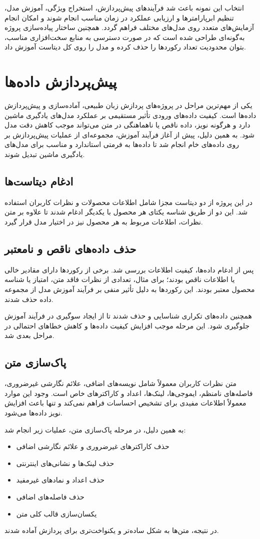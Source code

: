 انتخاب این نمونه باعث شد فرآیندهای پیش‌پردازش، استخراج ویژگی، آموزش مدل، تنظیم ابرپارامترها و ارزیابی عملکرد در زمان مناسب انجام شوند و امکان انجام آزمایش‌های متعدد روی مدل‌های مختلف فراهم گردد. همچنین ساختار پیاده‌سازی پروژه به‌گونه‌ای طراحی شده است که در صورت دسترسی به منابع سخت‌افزاری مناسب، بتوان محدودیت تعداد رکوردها را حذف کرده و مدل را روی کل دیتاست آموزش داد.
 \section{پیش‌پردازش داده‌ها}
 یکی از مهم‌ترین مراحل در پروژه‌های پردازش زبان طبیعی، آماده‌سازی و پیش‌پردازش داده‌ها است. کیفیت داده‌های ورودی تأثیر مستقیمی بر عملکرد مدل‌های یادگیری ماشین دارد و هرگونه نویز، داده ناقص یا ناهماهنگی در متن می‌تواند موجب کاهش دقت مدل شود. به همین دلیل، پیش از آغاز فرآیند آموزش، مجموعه‌ای از عملیات پیش‌پردازش بر روی داده‌های خام انجام شد تا داده‌ها به فرمتی استاندارد و مناسب برای مدل‌های یادگیری ماشین تبدیل شوند.
 \subsection{ادغام دیتاست‌ها }
 در این پروژه از دو دیتاست مجزا شامل اطلاعات محصولات و نظرات کاربران استفاده شد. این دو از طریق شناسه یکتای هر محصول  با یکدیگر ادغام شدند تا علاوه بر متن نظرات، اطلاعات مربوط به هر محصول نیز در اختیار مدل قرار گیرد.
 \subsection{حذف داده‌های ناقص و نامعتبر}
 پس از ادغام داده‌ها، کیفیت اطلاعات بررسی شد. برخی از رکوردها دارای مقادیر خالی یا اطلاعات ناقص بودند؛ برای مثال، تعدادی از نظرات فاقد متن، امتیاز یا شناسه محصول معتبر بودند. این رکوردها به دلیل تأثیر منفی بر فرآیند آموزش مدل از مجموعه داده حذف شدند.
 
 همچنین داده‌های تکراری شناسایی و حذف شدند تا از ایجاد سوگیری در فرآیند آموزش جلوگیری شود. این مرحله موجب افزایش کیفیت داده‌ها و کاهش خطاهای احتمالی در مراحل بعدی شد.
 \subsection{پاک‌سازی متن }
 متن نظرات کاربران معمولاً شامل نویسه‌های اضافی، علائم نگارشی غیرضروری، فاصله‌های نامنظم، ایموجی‌ها، لینک‌ها، اعداد و کاراکترهای خاص است. وجود این موارد معمولاً اطلاعات مفیدی برای تشخیص احساسات فراهم نمی‌کند و تنها باعث افزایش نویز داده‌ها می‌شود.
 
 به همین دلیل، در مرحله پاک‌سازی متن، عملیات زیر انجام شد:
 \begin{itemize}
 	\item  حذف کاراکترهای غیرضروری و علائم نگارشی اضافی
 	\item  حذف لینک‌ها و نشانی‌های اینترنتی
 	\item حذف اعداد و نمادهای غیرمفید
 	\item حذف فاصله‌های اضافی
 	\item  یکسان‌سازی قالب کلی متن
 \end{itemize}
 در نتیجه، متن‌ها به شکل ساده‌تر و یکنواخت‌تری برای پردازش آماده شدند.
